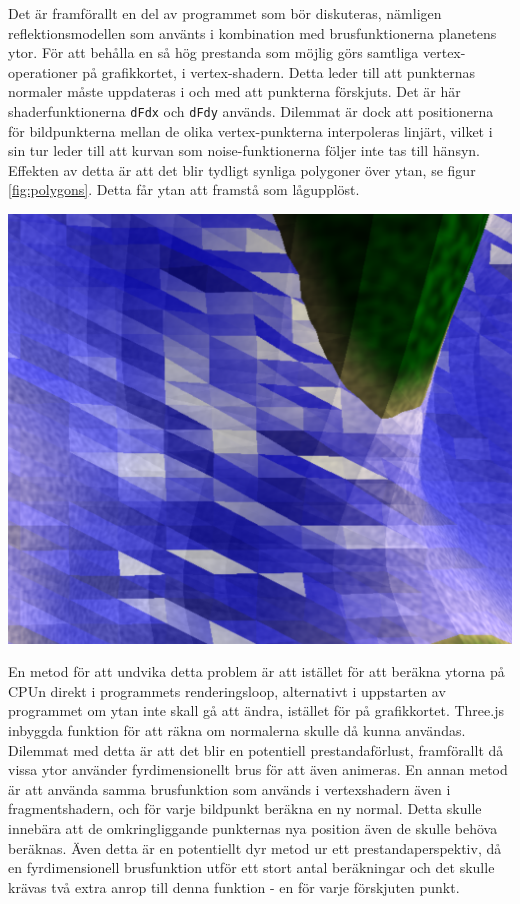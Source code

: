 \documentclass[conference]{IEEEtran}
\newenvironment{Figure}
  {\par\medskip\noindent\minipage{\linewidth}}
  {\endminipage\par\medskip}
\begin{document}
Det är framförallt en del av programmet som bör diskuteras, nämligen reflektionsmodellen som använts i kombination med brusfunktionerna planetens ytor. För att behålla en så hög prestanda som möjlig görs samtliga vertex-operationer på grafikkortet, i vertex-shadern. Detta leder till att punkternas normaler måste uppdateras i och med att punkterna förskjuts. Det är här shaderfunktionerna \texttt{dFdx} och \texttt{dFdy} används. Dilemmat är dock att positionerna för bildpunkterna mellan de olika vertex-punkterna interpoleras linjärt, vilket i sin tur leder till att kurvan som noise-funktionerna följer inte tas till hänsyn. Effekten av detta är att det blir tydligt synliga polygoner över ytan, se figur \ref{fig:polygons}. Detta får ytan att framstå som lågupplöst.

\begin{Figure}
  \centering
    \includegraphics[width=0.9\linewidth]{./images/polygons}
  \label{fig:polygons}
\end{Figure}

En metod för att undvika detta problem är att istället för att beräkna ytorna på CPUn direkt i programmets renderingsloop, alternativt i uppstarten av programmet om ytan inte skall gå att ändra, istället för på grafikkortet. Three.js inbyggda funktion för att räkna om normalerna skulle då kunna användas. Dilemmat med detta är att det blir en potentiell prestandaförlust, framförallt då vissa ytor använder fyrdimensionellt brus för att även animeras. En annan metod är att använda samma brusfunktion som används i vertexshadern även i fragmentshadern, och för varje bildpunkt beräkna en ny normal. Detta skulle innebära att de omkringliggande punkternas nya position även de skulle behöva beräknas. Även detta är en potentiellt dyr metod ur ett prestandaperspektiv, då en fyrdimensionell brusfunktion utför ett stort antal beräkningar och det skulle krävas två extra anrop till denna funktion - en för varje förskjuten punkt.
\end{document}
